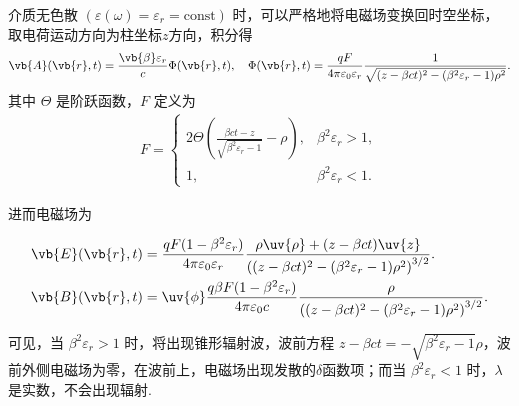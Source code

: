 \begin{exbox}
	介质无色散 \((\varepsilon(\omega) = \varepsilon_{r} = \text{const})\) 时，可以严格地将电磁场变换回时空坐标，取电荷运动方向为柱坐标\(z\)方向，积分得
	\begin{align*}
		\vb{A}(\vb{r},t) = \frac{\vb{\beta} \varepsilon_{r}}{c} \Phi(\vb{r},t), \quad
		\Phi(\vb{r},t) = \frac{q F}{4\pi \varepsilon_{0} \varepsilon_{r}} \frac{1}{\sqrt{(z - \beta c t)^{2} - (\beta^{2} \varepsilon_{r} - 1) \rho^{2}}}.
	\end{align*}
	其中 \(\Theta\) 是阶跃函数，\(F\) 定义为
	\begin{align*}
		F =
		\begin{cases}
			2 \Theta \left( \frac{\beta c t - z}{\sqrt{\beta^{2} \varepsilon_{r} - 1}} - \rho \right), & \beta^{2} \varepsilon_{r} > 1, \\
			1,                                                                                         & \beta^{2} \varepsilon_{r} < 1.
		\end{cases}
	\end{align*}

	进而电磁场为

	\begin{align*}
		\vb{E}(\vb{r},t) &= \frac{q F (1 - \beta^{2} \varepsilon_{r})}{4\pi \varepsilon_{0} \varepsilon_{r}} \frac{\rho \uv{\rho} + (z - \beta c t) \uv{z}}{\left( (z - \beta c t)^{2} - (\beta^{2} \varepsilon_{r} - 1) \rho^{2} \right)^{3/2}}.\\
		\vb{B}(\vb{r},t) &= \uv{\phi} \frac{q \beta F (1 - \beta^{2} \varepsilon_{r})}{4\pi \varepsilon_{0} c} \frac{\rho}{\left( (z - \beta c t)^{2} - (\beta^{2} \varepsilon_{r} - 1) \rho^{2} \right)^{3/2}}.
	\end{align*}

	可见，当 \(\beta^{2} \varepsilon_{r} > 1\) 时，将出现锥形辐射波，波前方程 \(z - \beta c t = -\sqrt{\beta^{2} \varepsilon_{r} - 1} \rho\)，波前外侧电磁场为零，在波前上，电磁场出现发散的\(\delta\)函数项；而当 \(\beta^{2} \varepsilon_{r} < 1\) 时，\(\lambda\) 是实数，不会出现辐射.
\end{exbox}

